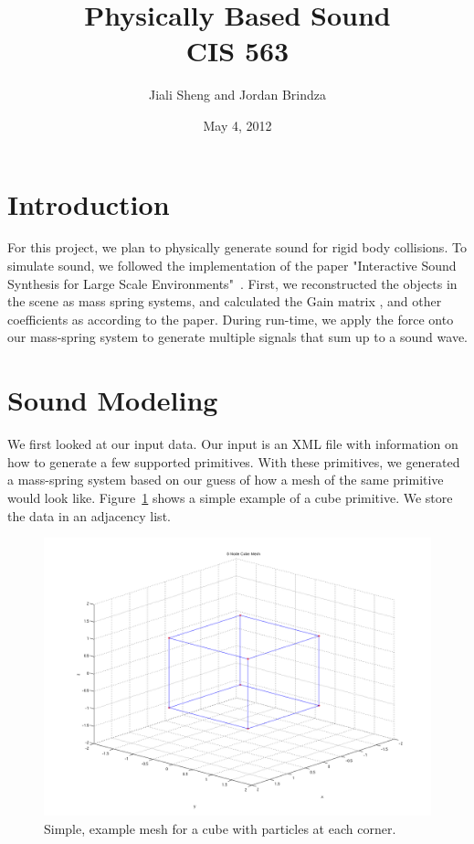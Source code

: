 \documentclass{article}
\begin{document}
\title{Physically Based Sound\\CIS 563}
\date{May 4, 2012}
\author{Jiali Sheng and Jordan Brindza}
\maketitle
  

\section{Introduction}

  For this project, we plan to physically generate sound for rigid body
  collisions. To simulate sound, we followed the implementation of the paper
  "Interactive Sound Synthesis for Large Scale Environments"~\cite{Raghuvanshi}. First, we
  reconstructed the objects in the scene as mass spring systems, and calculated
  the Gain matrix , and other coefficients as according to the paper. During
  run-time, we apply the force onto our mass-spring system to generate multiple
  signals that sum up to a sound wave. 

\section{Sound Modeling}

  We first looked at our input data. Our input is an XML file with information
  on how to generate a few supported primitives. With these primitives, we
  generated a mass-spring system based on our guess of how a mesh of the same
  primitive would look like. Figure~\ref{fig:cube_mesh} shows a simple example of a cube
  primitive. We store the data in an adjacency list. 

  \begin{figure}[H]
    \begin{center}
      \includegraphics[width=0.8\columnwidth]{cube_mesh_mesh_plot}
    \end{center} 
    \caption{Simple, example mesh for a cube with particles at each corner.}
    \label{fig:cube_mesh}
  \end{figure}
\end{document}

